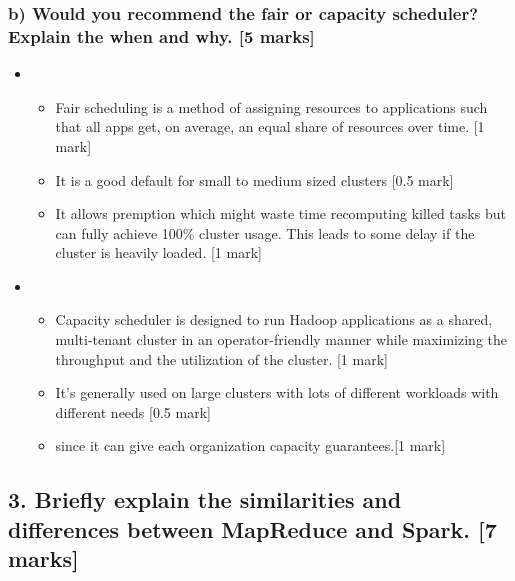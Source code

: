 \documentclass[11pt,a4paper]{article}
\begin{document}
\subsubsection*{b) Would you recommend the fair or capacity scheduler? Explain the when and why. [5 marks]}
\begin{itemize}
\item
\begin{itemize}
\item Fair scheduling is a method of assigning resources to applications such that all apps get, on average, an equal share of resources over time. [1 mark]
\item It is a good default for small to medium sized clusters [0.5 mark]
\item It allows premption which might waste time recomputing killed tasks but can fully achieve 100\% cluster usage. This leads to some delay if the cluster is heavily loaded. [1 mark]
\end{itemize}
\item
\begin{itemize}
\item Capacity scheduler is designed to run Hadoop applications as a shared, multi-tenant cluster in an operator-friendly manner while maximizing the throughput and the utilization of the cluster. [1 mark]
\item It's generally used on large clusters with lots of different workloads with different needs [0.5 mark]
\item since it can give each organization capacity guarantees.[1 mark]
\end{itemize}
\end{itemize}

\subsection*{3. Briefly explain the similarities and differences between MapReduce and Spark. [7 marks]}
\end{document}
